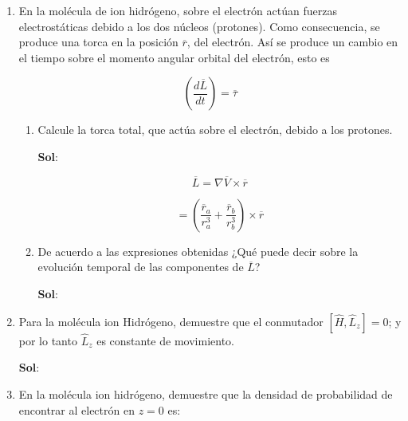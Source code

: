\documentclass[12pt,a4paper]{article}
\begin{document}
\begin{enumerate}




\item En la molécula de ion hidrógeno, sobre el electrón actúan fuerzas electrostáticas debido a los dos núcleos (protones). Como consecuencia, se produce una torca en la posición $\overline{r}$, del electrón. Así se produce un cambio en el tiempo sobre el momento angular orbital del electrón, esto es

\begin{equation*}
    \left(\frac{d\overline{L}}{dt}\right)= \overline{\tau}
\end{equation*}

\begin{enumerate}
    \item Calcule la torca total, que actúa sobre el electrón, debido a los protones.
    
    \textbf{Sol}:
    
    \begin{equation*}
        \overline{L} = \nabla \overline{V} \times \overline{r}
    \end{equation*}
    
    \begin{equation*}
        = \left(\frac{\overline{r}_a}{r_{a}^3}+ \frac{\overline{r}_b}{r_{b}^3}\right) \times \overline{r}
    \end{equation*}
    
    
    \item De acuerdo a las expresiones obtenidas ¿Qué puede decir sobre la evolución temporal de las componentes de $\overline{L}$?
    
    \textbf{Sol}:
    
\end{enumerate}








\item Para la molécula ion Hidrógeno, demuestre que el conmutador $[\hat{H},\hat{L}_z]=0$; y por lo tanto $\hat{L}_z$ es constante de movimiento.

\textbf{Sol}:









\item En la molécula ion hidrógeno, demuestre que la densidad de probabilidad de encontrar al electrón en $z=0$ es:


\end{enumerate}
\end{document}
